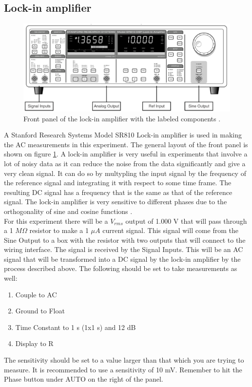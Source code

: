 \documentclass[twocolumn]{article}
\begin{document}
\subsection{Lock-in amplifier}
\begin{figure}
\includegraphics[width=\textwidth]{lock-in.png}
\caption{Front panel of the lock-in amplifier with the labeled components
\cite{ref:3}.}
\label{fig:7}
\end{figure}
A Stanford Research Systems Model SR810 Lock-in amplifier is used in making the 
AC measurements in this experiment. The general layout of the front panel is 
shown on figure \ref{fig:7}. A lock-in amplifier is very useful in experiments 
that involve a lot of noisy data as it can reduce the noise from the data 
significantly and give a very clean signal. It can do so by multypling the 
input signal by the frequency of the reference signal and integrating it with 
respect to some time frame. The resulting DC signal has a frequency that is the 
same as that of the reference signal. The lock-in amplifier is very sensitive 
to different phases due to the orthogonality of sine and cosine functions 
\cite{ref:3}.
\\
For this experiment there will be a $V_{rms}$ output of 1.000 V that will pass 
through a 1 $M\Omega$ resistor to make a 1 $\mu A$ current signal. This signal 
will come from the Sine Output to a box with the resistor with two outputs that 
will connect to the wiring interface. The signal is received by the Signal 
Inputs. This will be an AC signal that will be transformed into a DC signal 
by the lock-in amplifier by the process described above. The following should 
be set to take measurements as well:
\begin{enumerate}[label=\alph*]
\item Couple to AC
\item Ground to Float
\item Time Constant to 1 s (1x1 s) and 12 dB
\item Display to R
\end{enumerate}
The sensitivity should be set to a value larger than that which you are trying 
to measure. It is recommended to use a sensitivity of 10 mV. Remember to hit 
the Phase button under AUTO on the right of the panel.
\end{document}
